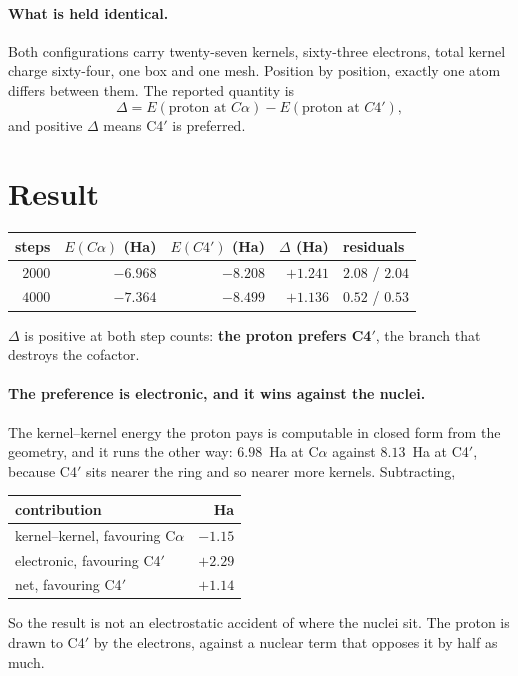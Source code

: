 \documentclass[11pt]{article}
\newcommand{\Ca}{C\ensuremath{\alpha}}
\newcommand{\Cfp}{C4\ensuremath{'}}
\begin{document}
\paragraph{What is held identical.} Both configurations carry twenty-seven kernels, sixty-three
electrons, total kernel charge sixty-four, one box and one mesh. Position by position, exactly one
atom differs between them. The reported quantity is
\[
\Delta = E(\text{proton at } \Ca{}) - E(\text{proton at } \Cfp{}),
\]
and positive $\Delta$ means \Cfp{} is preferred.

\section{Result}

\begin{center}
\small
\begin{tabular}{@{}rrrrl@{}}
\toprule
steps & $E(\Ca)$ (Ha) & $E(\Cfp)$ (Ha) & $\Delta$ (Ha) & residuals\\
\midrule
$2000$ & $-6.968$ & $-8.208$ & $+1.241$ & $2.08$ / $2.04$\\
$4000$ & $-7.364$ & $-8.499$ & $+1.136$ & $0.52$ / $0.53$\\
\bottomrule
\end{tabular}
\end{center}

\noindent $\Delta$ is positive at both step counts: \textbf{the proton prefers \Cfp{}}, the branch
that destroys the cofactor.

\paragraph{The preference is electronic, and it wins against the nuclei.} The kernel--kernel energy
the proton pays is computable in closed form from the geometry, and it runs the other way: $6.98$~Ha
at \Ca{} against $8.13$~Ha at \Cfp{}, because \Cfp{} sits nearer the ring and so nearer more kernels.
Subtracting,
\begin{center}
\small
\begin{tabular}{@{}lr@{}}
\toprule
contribution & Ha\\
\midrule
kernel--kernel, favouring \Ca{} & $-1.15$\\
electronic, favouring \Cfp{} & $+2.29$\\
\midrule
net, favouring \Cfp{} & $+1.14$\\
\bottomrule
\end{tabular}
\end{center}
\noindent So the result is not an electrostatic accident of where the nuclei sit. The proton is drawn
to \Cfp{} by the electrons, against a nuclear term that opposes it by half as much.
\end{document}
